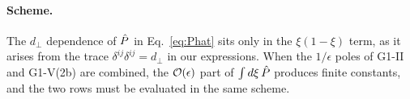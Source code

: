 \paragraph*{Scheme.} The $d_\perp$ dependence of $\hat P$ in Eq.~\eqref{eq:Phat} sits only in the $\xi(1-\xi)$ term, as it arises from the trace $\delta^{ij}\delta^{ij}=d_\perp$ in our expressions. When the $1/\epsilon$ poles of G1-II and G1-V(2b) are combined, the $\mathcal{O}(\epsilon)$ part of $\int d\xi\,\hat P$ produces finite constants, and the two rows must be evaluated in the same scheme.
